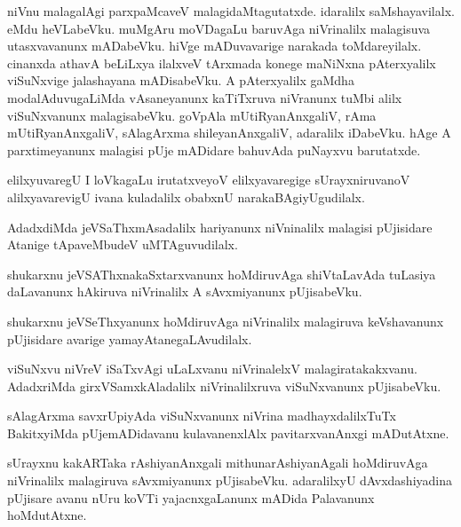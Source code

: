 \documentclass{article}
\begin{document}
\begin{mn}%
niVnu malagalAgi parxpaMcaveV malagidaMtagutatxde. idaralilx saMshayavilalx. eMdu heVLabeVku. 
muMgAru moVDagaLu baruvAga niVrinalilx malagisuva utasxvavanunx mADabeVku. hiVge mADuvavarige 
narakada toMdareyilalx. cinanxda athavA beLiLxya ilalxveV tArxmada konege maNiNxna pAterxyalilx 
viSuNxvige jalashayana mADisabeVku. A pAterxyalilx gaMdha modalAduvugaLiMda vAsaneyanunx 
kaTiTxruva niVranunx tuMbi alilx viSuNxvanunx malagisabeVku. goVpAla mUtiRyanAnxgaliV, rAma 
mUtiRyanAnxgaliV, sAlagArxma shileyanAnxgaliV, adaralilx iDabeVku. hAge A parxtimeyanunx malagisi 
pUje mADidare bahuvAda puNayxvu barutatxde.
\end{mn}

\begin{mn}%
elilxyuvaregU I loVkagaLu irutatxveyoV elilxyavaregige sUrayxniruvanoV alilxyavarevigU ivana 
kuladalilx obabxnU narakaBAgiyUgudilalx.
\end{mn}

\begin{mn}%
AdadxdiMda jeVSaThxmAsadalilx hariyanunx niVninalilx malagisi pUjisidare Atanige tApaveMbudeV 
uMTAguvudilalx.
\end{mn}

\begin{mn}%
shukarxnu jeVSAThxnakaSxtarxvanunx hoMdiruvAga shiVtaLavAda tuLasiya daLavanunx hAkiruva 
niVrinalilx A sAvxmiyanunx pUjisabeVku.
\end{mn}

\begin{mn}%
shukarxnu jeVSeThxyanunx hoMdiruvAga niVrinalilx malagiruva keVshavanunx pUjisidare avarige 
yamayAtanegaLAvudilalx.
\end{mn}

\begin{mn}%
viSuNxvu niVreV iSaTxvAgi uLaLxvanu niVrinalelxV malagiratakakxvanu. AdadxriMda girxVSamxkAladalilx 
niVrinalilxruva viSuNxvanunx pUjisabeVku.
\end{mn}

\begin{mn}%
sAlagArxma savxrUpiyAda viSuNxvanunx niVrina madhayxdalilxTuTx BakitxyiMda pUjemADidavanu 
kulavanenxlAlx pavitarxvanAnxgi mADutAtxne.
\end{mn}

\begin{mn}%
sUrayxnu kakARTaka rAshiyanAnxgali mithunarAshiyanAgali hoMdiruvAga niVrinalilx malagiruva 
sAvxmiyanunx pUjisabeVku. adaralilxyU dAvxdashiyadina pUjisare avanu nUru koVTi yajacnxgaLanunx 
mADida Palavanunx hoMdutAtxne.
\end{mn}
\end{document}
